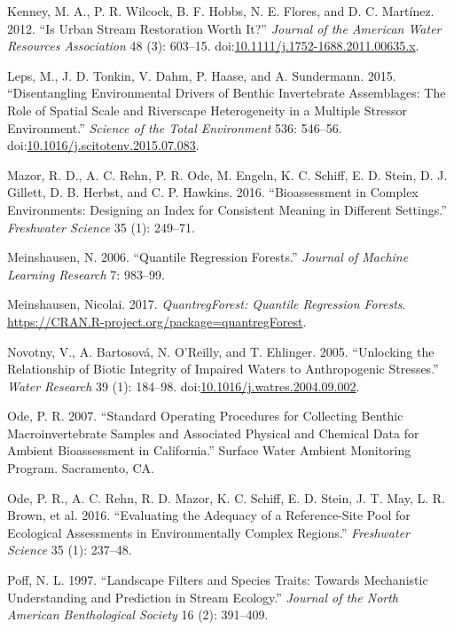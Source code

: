 \documentclass[]{article}
\begin{document}
\hypertarget{ref-Kenney12}{}
Kenney, M. A., P. R. Wilcock, B. F. Hobbs, N. E. Flores, and D. C.
Martínez. 2012. ``Is Urban Stream Restoration Worth It?'' \emph{Journal
of the American Water Resources Association} 48 (3): 603--15.
doi:\href{https://doi.org/10.1111/j.1752-1688.2011.00635.x}{10.1111/j.1752-1688.2011.00635.x}.

\hypertarget{ref-Leps15}{}
Leps, M., J. D. Tonkin, V. Dahm, P. Haase, and A. Sundermann. 2015.
``Disentangling Environmental Drivers of Benthic Invertebrate
Assemblages: The Role of Spatial Scale and Riverscape Heterogeneity in a
Multiple Stressor Environment.'' \emph{Science of the Total Environment}
536: 546--56.
doi:\href{https://doi.org/10.1016/j.scitotenv.2015.07.083}{10.1016/j.scitotenv.2015.07.083}.

\hypertarget{ref-Mazor16}{}
Mazor, R. D., A. C. Rehn, P. R. Ode, M. Engeln, K. C. Schiff, E. D.
Stein, D. J. Gillett, D. B. Herbst, and C. P. Hawkins. 2016.
``Bioassessment in Complex Environments: Designing an Index for
Consistent Meaning in Different Settings.'' \emph{Freshwater Science} 35
(1): 249--71.

\hypertarget{ref-Meinshausen06}{}
Meinshausen, N. 2006. ``Quantile Regression Forests.'' \emph{Journal of
Machine Learning Research} 7: 983--99.

\hypertarget{ref-Meinshausen17}{}
Meinshausen, Nicolai. 2017. \emph{QuantregForest: Quantile Regression
Forests}. \url{https://CRAN.R-project.org/package=quantregForest}.

\hypertarget{ref-Novotny05}{}
Novotny, V., A. Bartosová, N. O'Reilly, and T. Ehlinger. 2005.
``Unlocking the Relationship of Biotic Integrity of Impaired Waters to
Anthropogenic Stresses.'' \emph{Water Research} 39 (1): 184--98.
doi:\href{https://doi.org/10.1016/j.watres.2004.09.002}{10.1016/j.watres.2004.09.002}.

\hypertarget{ref-Ode07}{}
Ode, P. R. 2007. ``Standard Operating Procedures for Collecting Benthic
Macroinvertebrate Samples and Associated Physical and Chemical Data for
Ambient Bioassessment in California.'' Surface Water Ambient Monitoring
Program. Sacramento, CA.

\hypertarget{ref-Ode16}{}
Ode, P. R., A. C. Rehn, R. D. Mazor, K. C. Schiff, E. D. Stein, J. T.
May, L. R. Brown, et al. 2016. ``Evaluating the Adequacy of a
Reference-Site Pool for Ecological Assessments in Environmentally
Complex Regions.'' \emph{Freshwater Science} 35 (1): 237--48.

\hypertarget{ref-Poff97}{}
Poff, N. L. 1997. ``Landscape Filters and Species Traits: Towards
Mechanistic Understanding and Prediction in Stream Ecology.''
\emph{Journal of the North American Benthological Society} 16 (2):
391--409.
\end{document}
